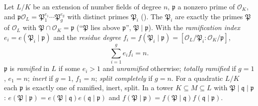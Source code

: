 \begin{theorem}[$\sum e_if_i=n$]\label{thm:ant:efg}
Let $L/K$ be an extension of number fields of degree $n$, $\mathfrak p$ a nonzero prime of $\mathcal O_K$, and $\mathfrak p\mathcal O_L=
\mathfrak P_1^{e_1}\cdots\mathfrak P_g^{e_g}$ with distinct primes $\mathfrak P_i$ (). The $\mathfrak P_i$ are exactly the
primes $\mathfrak P$ of $\mathcal O_L$ with $\mathfrak P\cap\mathcal O_K=\mathfrak p$ (``$\mathfrak P$ lies above $\mathfrak p$'', $\mathfrak P\mid\mathfrak p$). With the
\emph{ramification index} $e_i=e(\mathfrak P_i\mid\mathfrak p)$ and the \emph{residue degree} $f_i=f(\mathfrak P_i\mid\mathfrak p)=[\mathcal O_L/\mathfrak P_i:
\mathcal O_K/\mathfrak p]$,
\[
\sum_{i=1}^ge_if_i=n.
\]
$\mathfrak p$ is \emph{ramified} in $L$ if some $e_i>1$ and \emph{unramified} otherwise; \emph{totally ramified} if $g=1$, $e_1=n$; \emph{inert} if
$g=1$, $f_1=n$; \emph{split completely} if $g=n$. For a quadratic $L/K$ each $\mathfrak p$ is exactly one of ramified, inert, split. In a tower
$K\subseteq M\subseteq L$ with $\mathfrak P\mid\mathfrak q\mid\mathfrak p$: $e(\mathfrak P\mid\mathfrak p)=e(\mathfrak P\mid\mathfrak q)e(\mathfrak q\mid\mathfrak p)$ and
$f(\mathfrak P\mid\mathfrak p)=f(\mathfrak P\mid\mathfrak q)f(\mathfrak q\mid\mathfrak p)$.
\end{theorem}

